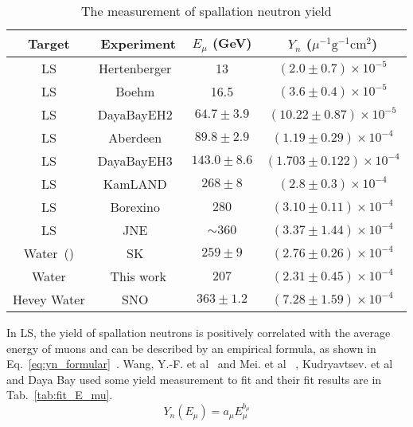 \begin{table}[htbp]
	\centering
	\caption{The measurement of spallation neutron yield}
	\label{tab:syn_summary}
	\begin{tabular}{cccc}
		\toprule
		Target          & Experiment                            & $E_{\mu}$ (\si{GeV}) & $Y_n$ ($\mu^{-1}\mathrm{g}^{-1}\mathrm{cm}^{2}$) \\
		\midrule
		LS              & Hertenberger~\cite{spnYn_hertenberge} & 13                   & $(2.0 \pm 0.7) \times 10^{-5}$                   \\
		LS              & Boehm~\cite{spnYn_Boehm}              & 16.5                 & $(3.6 \pm 0.4) \times 10^{-5}$                   \\
		LS              & DayaBayEH2~\cite{spnYn_Daya_bay}      & $64.7\pm3.9$         & $(10.22 \pm 0.87) \times 10^{-5}$                \\
		LS              & Aberdeen~\cite{spnYn_Aberdeen}        & $89.8\pm2.9$         & $(1.19 \pm 0.29) \times 10^{-4}$                 \\
		LS              & DayaBayEH3~\cite{spnYn_Daya_bay}      & $143.0\pm8.6$        & $(1.703 \pm0.122) \times 10^{-4}$                \\
		LS              & KamLAND~\cite{spnYn_KamLAND}          & $268\pm8$            & $(2.8 \pm 0.3) \times 10^{-4}$                   \\
		LS              & Borexino~\cite{spnYn_Borexino}        & $280$                & $(3.10 \pm 0.11) \times 10^{-4}$                 \\
		LS              & JNE~\cite{spnYn_JNE}                  & $\sim 360$           & $(3.37 \pm 1.44) \times 10^{-4}$                 \\
		Water~(\ce{Gd}) & SK~\cite{SK_spnYn}                    & $259\pm9$            & $(2.76 \pm 0.26) \times 10^{-4}$                 \\
		Water           & This work                             & $207$                & $(2.31 \pm 0.45) \times 10^{-4}$                 \\
		Hevey Water     & SNO~\cite{sno_spnYn}                  & $363\pm1.2$          & $(7.28 \pm 1.59) \times 10^{-4}$                 \\
		\bottomrule
	\end{tabular}
\end{table}

In LS, the yield of spallation neutrons is positively correlated with the average energy of muons and can be described by an empirical formula, as shown in Eq.~\eqref{eq:yn_formular}~\cite{spnYn_Boehm,Predict_LS_Wang,Formuler_1,Predict_LS_Mei}. Wang, Y.-F. et al~\cite{Predict_LS_Wang} and Mei. et al~\cite{Predict_LS_Mei} , Kudryavtsev. et al~\cite{Kudryavtsev} and Daya Bay\cite{spnYn_Daya_bay} used some yield measurement to fit and their fit results are in Tab.~\ref{tab:fit_E_mu}.
\begin{equation}
	\label{eq:yn_formular}
	Y_n(E_{\mu}) = a_{\mu}E_{\mu}^{b_{\mu}}
\end{equation}

